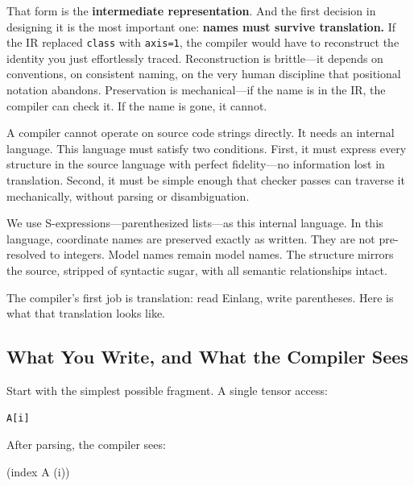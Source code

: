 \documentclass[11pt,titlepage]{article}
\newenvironment{Shaded}{}{}
\newcommand{\NormalTok}[1]{#1}
\begin{document}
That form is the \textbf{intermediate representation}. And the first
decision in designing it is the most important one: \textbf{names must
survive translation.} If the IR replaced \texttt{class} with
\texttt{axis=1}, the compiler would have to reconstruct the identity you
just effortlessly traced. Reconstruction is brittle---it depends on
conventions, on consistent naming, on the very human discipline that
positional notation abandons. Preservation is mechanical---if the name
is in the IR, the compiler can check it. If the name is gone, it cannot.

A compiler cannot operate on source code strings directly. It needs an
internal language. This language must satisfy two conditions. First, it
must express every structure in the source language with perfect
fidelity---no information lost in translation. Second, it must be simple
enough that checker passes can traverse it mechanically, without parsing
or disambiguation.

We use S-expressions---parenthesized lists---as this internal language.
In this language, coordinate names are preserved exactly as written.
They are not pre-resolved to integers. Model names remain model names.
The structure mirrors the source, stripped of syntactic sugar, with all
semantic relationships intact.

The compiler's first job is translation: read Einlang, write
parentheses. Here is what that translation looks like.

\vspace{2em}

\hypertarget{what-you-write-and-what-the-compiler-sees}{%
\subsection{What You Write, and What the Compiler
Sees}\label{what-you-write-and-what-the-compiler-sees}}

Start with the simplest possible fragment. A single tensor access:

\begin{verbatim}
A[i]
\end{verbatim}

After parsing, the compiler sees:

\begin{Shaded}
\begin{Highlighting}[]
\NormalTok{(index A (i))}
\end{Highlighting}
\end{Shaded}
\end{document}

